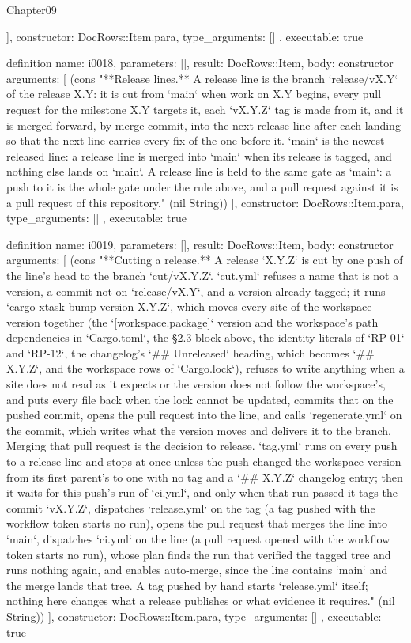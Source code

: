 \begin{lexlean}{Chapter09}
\begin{semanticmodule}
{{    ],
    constructor: DocRows::Item.para,
    type_arguments: []
  },
  executable: true
}

definition{
  name: i0018,
  parameters: [],
  result: DocRows::Item,
  body: constructor{
    arguments: [
      (cons "**Release lines.** A release line is the branch `release/vX.Y` of the release X.Y: it is cut from `main` when work on X.Y begins, every pull request for the milestone X.Y targets it, each `vX.Y.Z` tag is made from it, and it is merged forward, by merge commit, into the next release line after each landing so that the next line carries every fix of the one before it. `main` is the newest released line: a release line is merged into `main` when its release is tagged, and nothing else lands on `main`. A release line is held to the same gate as `main`: a push to it is the whole gate under the rule above, and a pull request against it is a pull request of this repository." (nil String))
    ],
    constructor: DocRows::Item.para,
    type_arguments: []
  },
  executable: true
}

definition{
  name: i0019,
  parameters: [],
  result: DocRows::Item,
  body: constructor{
    arguments: [
      (cons "**Cutting a release.** A release `X.Y.Z` is cut by one push of the line's head to the branch `cut/vX.Y.Z`. `cut.yml` refuses a name that is not a version, a commit not on `release/vX.Y`, and a version already tagged; it runs `cargo xtask bump-version X.Y.Z`, which moves every site of the workspace version together (the `[workspace.package]` version and the workspace's path dependencies in `Cargo.toml`, the §2.3 block above, the identity literals of `RP-01` and `RP-12`, the changelog's `## Unreleased` heading, which becomes `## X.Y.Z`, and the workspace rows of `Cargo.lock`), refuses to write anything when a site does not read as it expects or the version does not follow the workspace's, and puts every file back when the lock cannot be updated, commits that on the pushed commit, opens the pull request into the line, and calls `regenerate.yml` on the commit, which writes what the version moves and delivers it to the branch. Merging that pull request is the decision to release. `tag.yml` runs on every push to a release line and stops at once unless the push changed the workspace version from its first parent's to one with no tag and a `## X.Y.Z` changelog entry; then it waits for this push's run of `ci.yml`, and only when that run passed it tags the commit `vX.Y.Z`, dispatches `release.yml` on the tag (a tag pushed with the workflow token starts no run), opens the pull request that merges the line into `main`, dispatches `ci.yml` on the line (a pull request opened with the workflow token starts no run), whose plan finds the run that verified the tagged tree and runs nothing again, and enables auto-merge, since the line contains `main` and the merge lands that tree. A tag pushed by hand starts `release.yml` itself; nothing here changes what a release publishes or what evidence it requires." (nil String))
    ],
    constructor: DocRows::Item.para,
    type_arguments: []
  },
  executable: true
}


\end{semanticmodule}
\end{lexlean}
